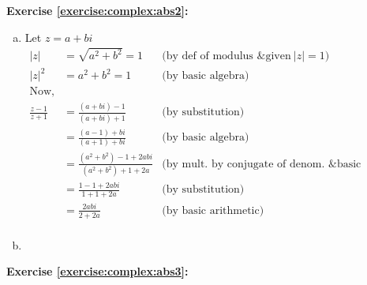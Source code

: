 \noindent\textbf{Exercise \ref{exercise:complex:abs2}:} %
\begin{enumerate}[(a)]
\item
Let $z=a+bi$\\
\begin{align*}
            |z|&=\sqrt{a^{2}+b^{2}}=1 & \text{(by def of modulus \& given}\ |z|=1)\\
            |z|^2&=a^{2}+b^{2}=1      & \text{(by basic algebra)}\\
            \text{Now,}\\
            \frac{z-1}{z+1}&=\frac{(a+bi)-1}{(a+bi)+1} & \text{(by substitution)}\\
            &=\frac{(a-1)+bi}{(a+1)+bi} & \text{(by basic algebra)}\\
            &=\frac{(a^{2}+b^{2})-1+2abi}{(a^{2}+b^{2})+1+2a} & \text{(by mult. by conjugate of denom. \& basic algebra)}\\
            &=\frac{1-1+2abi}{1+1+2a} & \text{(by substitution)}\\
            &=\frac{2abi}{2+2a} & \text{(by basic arithmetic)}\\
            \end{align*}

\item
\end{enumerate}

\noindent\textbf{Exercise \ref{exercise:complex:abs3}:}\\
%
%
%
%

